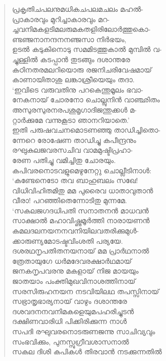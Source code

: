 \begin{verse}
പ്രകൃതിചപലനുമധികചപലമചലം മഹല്‍-\\
പ്രാകാരവും മുറിച്ചാകാരവും മറ-\\
ച്ചവനിമകളടിമലരുമകതളിരിലോര്‍ത്തുകൊ-\\
ണ്ടഞ്ജനാനന്ദനനഞ്ജസാ നിര്‍ഭയം,\\
ഉടല്‍ കടുകിനൊടു സമമിടത്തുകാല്‍ മുമ്പില്‍ വ-\\
ച്ചുള്ളില്‍ കടപ്പാന്‍ തുടങ്ങും ദശാന്തരേ\\
കഠിനതരമലറിയൊരു രജനിചരിവേഷമായ്\\
കാണായിതാശു ലങ്കാശ്രീയെയും തദാ.\\
‘ഇവിടെ വരുവതിനു പറകെന്തുമൂലം ഭവാ-\\
നേകനായ് ചോരനോ ചൊല്ലുനിന്‍ വാഞ്ഛിതം\\
അസുരസുരനരപശുമൃഗാദിജന്തുക്കള്‍ മ-\\
റ്റാര്‍ക്കുമേ വന്നുകൂടാ ഞാനറിയാതെ.’\\
ഇതി പരുഷവചനമൊടണഞ്ഞു താഡിച്ചിതൊ-\\
ന്നേറെ രോഷേണ താഡിച്ചു കപീന്ദ്രനും\\
രഘുകുലജവരസചിവ വാമമുഷ്ടിപ്രഹാ-\\
രേണ പതിച്ചു വമിച്ചിതു ചോരയും.\\
കപിവരനൊടവളുമെഴുനേറ്റു ചൊല്ലീടിനാള്‍:\\
‘കണ്ടേനെടോ തവ ബാഹുബലം സഖേ!\\
വിധിവിഹിതമിതു മമ പുരൈവ ധാതാവുതാന്‍\\
വീരാ! പറഞ്ഞിതെന്നോടിതു മുന്നമേ.\\
‘സകലജഗദധിപതി സനാതനന്‍ മാധവന്‍\\
സാക്ഷാല്‍ മഹാവിഷ്ണുമൂര്‍ത്തി നാരായണന്‍\\
കമലദലനയനനവനിയിലവതരിക്കുമുള്‍-\\
ക്കാരുണ്യമോടഷ്ടവിംശതി പര്യയേ.\\
ദശരഥനൃപതിതനയനായ് മമ പ്രാര്‍ഥനാല്‍\\
ത്രേതായുഗേ ധര്‍മദേവരക്ഷാര്‍ഥമായ്\\
ജനകനൃപവരനു മകളായ് നിജ മായയും\\
ജാതയാം പംക്തിമുഖവിനാശത്തിനായ്\\
സരസിരുഹനയന നടവിയിലഥ തപസ്സിനായ്\\
സഭ്രാതൃഭാര്യനായ് വാഴും ദശാന്തരേ\\
ദശവദനനവനിമകളെയുമപഹരിച്ചുടന്‍\\
ദക്ഷിണവാരിധി പിക്കിരിക്കുന്ന നാള്‍\\
സപദി രഘുവരനൊടരുണജന്നു സാചിവ്യവും\\
സംഭവിക്കും, പുനസ്സുഗ്രീവശാസനാല്‍\\
സകല ദിശി കപികള്‍ തിരവാന്‍ നടക്കുന്നതില്‍\\

\end{verse}
